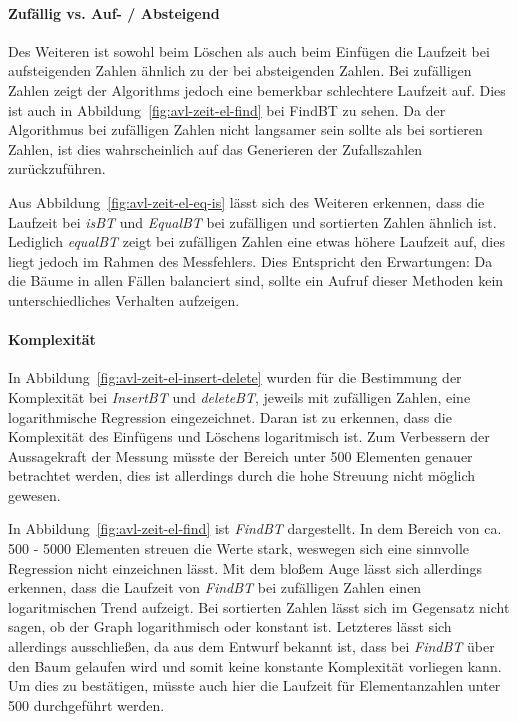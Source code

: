 \paragraph{Zufällig vs. Auf- / Absteigend}
Des Weiteren ist sowohl beim Löschen als auch beim Einfügen die Laufzeit bei aufsteigenden Zahlen
ähnlich zu der bei absteigenden Zahlen.
Bei zufälligen Zahlen zeigt der Algorithms jedoch eine bemerkbar schlechtere Laufzeit auf.
Dies ist auch in Abbildung~\ref{fig:avl-zeit-el-find} bei FindBT zu sehen.
Da der Algorithmus bei zufälligen Zahlen nicht langsamer sein sollte als bei sortieren Zahlen, ist
dies wahrscheinlich auf das Generieren der Zufallszahlen zurückzuführen.

Aus Abbildung~\ref{fig:avl-zeit-el-eq-is} lässt sich des Weiteren erkennen, dass die Laufzeit
bei \textit{isBT} und \textit{EqualBT} bei zufälligen und sortierten Zahlen ähnlich ist.
Lediglich \textit{equalBT} zeigt bei zufälligen Zahlen eine etwas höhere Laufzeit auf, dies liegt
jedoch im Rahmen des Messfehlers.
Dies Entspricht den Erwartungen: Da die Bäume in allen Fällen balanciert sind, sollte ein Aufruf
dieser Methoden kein unterschiedliches Verhalten aufzeigen.

\paragraph{Komplexität}
In Abbildung~\ref{fig:avl-zeit-el-insert-delete} wurden für die Bestimmung der Komplexität
bei \textit{InsertBT} und \textit{deleteBT}, jeweils mit zufälligen Zahlen, eine logarithmische
Regression eingezeichnet.
Daran ist zu erkennen, dass die Komplexität des Einfügens und Löschens logaritmisch ist.
Zum Verbessern der Aussagekraft der Messung müsste der Bereich unter 500 Elementen genauer
betrachtet werden, dies ist allerdings durch die hohe Streuung nicht möglich gewesen.

In Abbildung~\ref{fig:avl-zeit-el-find} ist \textit{FindBT} dargestellt.
In dem Bereich von ca. 500 - 5000 Elementen streuen die Werte stark, weswegen sich eine sinnvolle
Regression nicht einzeichnen lässt.
Mit dem bloßem Auge lässt sich allerdings erkennen, dass die Laufzeit von \textit{FindBT} bei
zufälligen
Zahlen einen logaritmischen Trend aufzeigt.
Bei sortierten Zahlen lässt sich im Gegensatz nicht sagen, ob der Graph logarithmisch oder konstant
ist.
Letzteres lässt sich allerdings ausschließen, da aus dem Entwurf bekannt ist, dass bei
\textit{FindBT} über
den Baum gelaufen wird und somit keine konstante Komplexität vorliegen kann.
Um dies zu bestätigen, müsste auch hier die Laufzeit für Elementanzahlen unter 500
durchgeführt werden.

